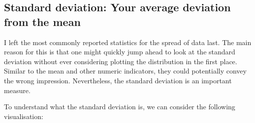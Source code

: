 \documentclass[
]{book}
\newenvironment{Shaded}{\begin{snugshade}}{\end{snugshade}}
\newcommand{\AttributeTok}[1]{\textcolor[rgb]{0.77,0.63,0.00}{#1}}
\newcommand{\CommentTok}[1]{\textcolor[rgb]{0.56,0.35,0.01}{\textit{#1}}}
\newcommand{\ConstantTok}[1]{\textcolor[rgb]{0.00,0.00,0.00}{#1}}
\newcommand{\FunctionTok}[1]{\textcolor[rgb]{0.00,0.00,0.00}{#1}}
\newcommand{\NormalTok}[1]{#1}
\newcommand{\OtherTok}[1]{\textcolor[rgb]{0.56,0.35,0.01}{#1}}
\newcommand{\SpecialCharTok}[1]{\textcolor[rgb]{0.00,0.00,0.00}{#1}}
\newcommand{\StringTok}[1]{\textcolor[rgb]{0.31,0.60,0.02}{#1}}
\begin{document}
\hypertarget{standard-deviation}{%
\subsection{Standard deviation: Your average deviation from the mean}\label{standard-deviation}}

I left the most commonly reported statistics for the spread of data last. The main reason for this is that one might quickly jump ahead to look at the standard deviation without ever considering plotting the distribution in the first place. Similar to the mean and other numeric indicators, they could potentially convey the wrong impression. Nevertheless, the standard deviation is an important measure.

To understand what the standard deviation is, we can consider the following visualisation:

\begin{Shaded}
\end{Shaded}
\end{document}
